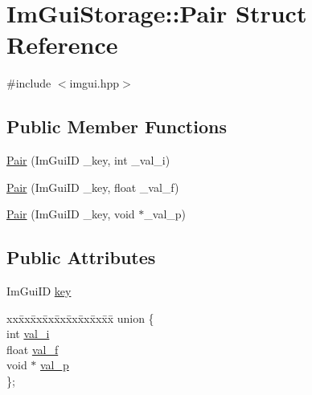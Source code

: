 \hypertarget{struct_im_gui_storage_1_1_pair}{}\section{Im\+Gui\+Storage\+:\+:Pair Struct Reference}
\label{struct_im_gui_storage_1_1_pair}


{\ttfamily \#include $<$imgui.\+hpp$>$}

\subsection*{Public Member Functions}
\begin{DoxyCompactItemize}
\item 
\hyperlink{struct_im_gui_storage_1_1_pair_a37542a22048f0af35e5a6beda6900a0e}{Pair} (Im\+Gui\+ID \+\_\+key, int \+\_\+val\+\_\+i)
\item 
\hyperlink{struct_im_gui_storage_1_1_pair_a6f63f598513f2a7a57f2e9ea3b0137b9}{Pair} (Im\+Gui\+ID \+\_\+key, float \+\_\+val\+\_\+f)
\item 
\hyperlink{struct_im_gui_storage_1_1_pair_a4d07d60f83b4e24ee8be9ccceaab76bd}{Pair} (Im\+Gui\+ID \+\_\+key, void $\ast$\+\_\+val\+\_\+p)
\end{DoxyCompactItemize}
\subsection*{Public Attributes}
\begin{DoxyCompactItemize}
\item 
Im\+Gui\+ID \hyperlink{struct_im_gui_storage_1_1_pair_a5b37b692d2eacc7f4f5b6f233359e6ce}{key}
\item 
\begin{tabbing}
xx\=xx\=xx\=xx\=xx\=xx\=xx\=xx\=xx\=\kill
union \{\\
\>int \hyperlink{struct_im_gui_storage_1_1_pair_ad6d89ae042ab3e6db8b1e1cf47b05c5e}{val\_i}\\
\>float \hyperlink{struct_im_gui_storage_1_1_pair_adf93d369480896f4d4b6dbf707de7bc8}{val\_f}\\
\>void $\ast$ \hyperlink{struct_im_gui_storage_1_1_pair_ac678b2f593c5de682b84ef41e9f30b06}{val\_p}\\
\}; \\

\end{tabbing}\end{DoxyCompactItemize}


